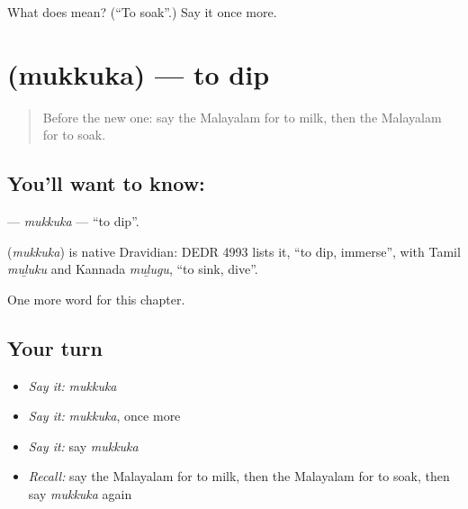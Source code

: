 \begin{tcolorbox}[breakable,colback=teal!4,colframe=teal!35!black,title={Before you move on}]
What does  mean? (\textquotedblleft{}To soak\textquotedblright{}.) Say it once more.
\end{tcolorbox}
\section[\texorpdfstring{\ml{മുക്കുക} (mukkuka)}{മുക്കുക (mukkuka)}]{ (mukkuka) — to dip}

\label{lesson:ML-C232-mukkuka}



\begin{quote}
Before the new one: say the Malayalam for to milk, then the Malayalam for to soak.
\end{quote}

\subsection*{You'll want to know: }
\textbf{} — \emph{mukkuka} — \textquotedblleft{}to dip\textquotedblright{}.

\begin{cousinweb}
\textbf{} (\emph{mukkuka}) is native Dravidian: DEDR 4993 lists it, \textquotedblleft{}to dip, immerse\textquotedblright{}, with Tamil \emph{muḻuku} and Kannada \emph{muḻugu}, \textquotedblleft{}to sink, dive\textquotedblright{}.
\end{cousinweb}

\begin{grammarlens}[title={What you've built}]
One more word for this chapter.
\end{grammarlens}

\subsection*{Your turn}
\begin{itemize}
\raggedright
  \item \emph{Say it:} \emph{mukkuka}
  \item \emph{Say it:} \emph{mukkuka}, once more
  \item \emph{Say it:} say \emph{mukkuka}
  \item \emph{Recall:} say the Malayalam for to milk, then the Malayalam for to soak, then say \emph{mukkuka} again
\end{itemize}

